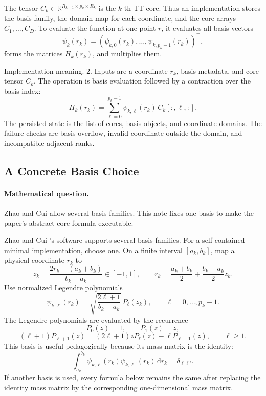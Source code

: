 \documentclass[11pt]{article}
\newcommand{\R}{\mathbb R}
\newcommand{\dd}{\,\mathrm d}
\begin{document}
The tensor \(C_k\in\R^{R_{k-1}\times p_k\times R_k}\) is the \(k\)-th TT core.
Thus an implementation stores the basis family, the domain map for each
coordinate, and the core arrays \(C_1,\ldots,C_D\).  To evaluate the function at
one point \(r\), it evaluates all basis vectors
\[
    \psi_k(r_k)
    =
    (\psi_{k,0}(r_k),\ldots,\psi_{k,p_k-1}(r_k))^\top,
\]
forms the matrices \(H_k(r_k)\), and multiplies them.

Implementation meaning. 2.  Inputs are a coordinate \(r_k\), basis
metadata, and core tensor \(C_k\).  The operation is basis evaluation followed
by a contraction over the basis index:
\[
    H_k(r_k)=\sum_{\ell=0}^{p_k-1}\psi_{k,\ell}(r_k)\,C_k[:,\ell,:].
    \label{eq:p24-tt-3a}
\]
The persisted state is the list of cores, basis objects, and coordinate
domains.  The failure checks are basis overflow, invalid coordinate outside the
domain, and incompatible adjacent ranks.

\subsection{A Concrete Basis Choice}

\paragraph{Mathematical question.}
Zhao and Cui \cite{zhao2024ttsequential} allow several basis families.  This note fixes one basis to make the
paper's abstract core formula executable.

Zhao and Cui \cite{zhao2024ttsequential}'s software supports several basis families.  For a self-contained
minimal implementation, choose one.  On a finite interval
\([a_k,b_k]\), map a physical coordinate \(r_k\) to
\[
    z_k=\frac{2r_k-(a_k+b_k)}{b_k-a_k}\in[-1,1],
    \qquad
    r_k=\frac{a_k+b_k}{2}+\frac{b_k-a_k}{2}z_k.
    \label{eq:p24-tt-6}
\]
Use normalized Legendre polynomials
\[
    \psi_{k,\ell}(r_k)
    =
    \sqrt{\frac{2\ell+1}{b_k-a_k}}\,
    P_\ell(z_k),
    \qquad \ell=0,\ldots,p_k-1.
    \label{eq:p24-tt-7}
\]
The Legendre polynomials are evaluated by the recurrence
\[
    P_0(z)=1,\qquad P_1(z)=z,
\]
\[
    (\ell+1)P_{\ell+1}(z)
    =
    (2\ell+1)zP_\ell(z)-\ell P_{\ell-1}(z),
    \qquad \ell\ge1.
    \label{eq:p24-tt-8}
\]
This basis is useful pedagogically because its mass matrix is the identity:
\[
    \int_{a_k}^{b_k}\psi_{k,\ell}(r_k)\psi_{k,\ell'}(r_k)\dd r_k
    =
    \delta_{\ell\ell'}.
    \label{eq:p24-tt-9}
\]
If another basis is used, every formula below remains the same after replacing
the identity mass matrix by the corresponding one-dimensional mass matrix.
\end{document}

